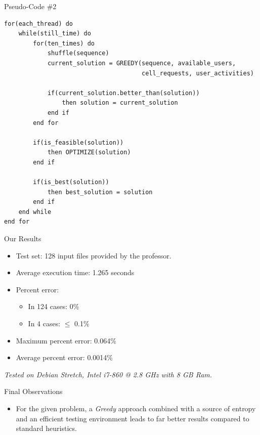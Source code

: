 \documentclass[]{beamer}
\newcommand{\hl}[1]{{\color[HTML]{26BF18} #1}}
\begin{document}
\begin{frame}[fragile]{\fontUbuntu Pseudo-Code \#2}
	\begin{lstlisting}
for(each_thread) do
	while(still_time) do
		for(ten_times) do
			shuffle(sequence)	
			current_solution = GREEDY(sequence, available_users,                                                   
   									  cell_requests, user_activities)
                      
			if(current_solution.better_than(solution))
				then solution = current_solution
			end if                          
		end for
		
		if(is_feasible(solution))                       
			then OPTIMIZE(solution)
		end if
		
		if(is_best(solution))
			then best_solution = solution
		end if
	end while
end for
	\end{lstlisting}
\end{frame}

\begin{frame} {\fontUbuntu Our Results}
	\begin{itemize}
		\item Test set: 128 input files provided by the professor.
		\item Average execution time: {\color[HTML]{26BF18} 1.265 seconds}
		\item Percent error:
			\begin{itemize}
				\item In 124 cases: 0\% 
				\item In 4 cases: $\bm{\leqslant}$ 0.1\%
			\end{itemize}
		\item Maximum percent error: 0.064\%
		\item Average percent error: {\color[HTML]{26BF18} 0.0014\%}
	\end{itemize}
	
	\bigskip
	\bigskip
	\bigskip
	\begin{flushright}
		\textit{\scriptsize Tested on Debian Stretch, Intel i7-860 @ 2.8 GHz with 8 GB Ram.}
	\end{flushright}

\end{frame}

\begin{frame}{\fontUbuntu Final Observations}
	\begin{itemize}
		\item For the given problem, a \textit{Greedy} approach combined with a source of \hl{entropy} and an \hl{efficient testing environment} leads to far better results compared to standard heuristics.
	\end{itemize}
\end{frame}
\end{document}
